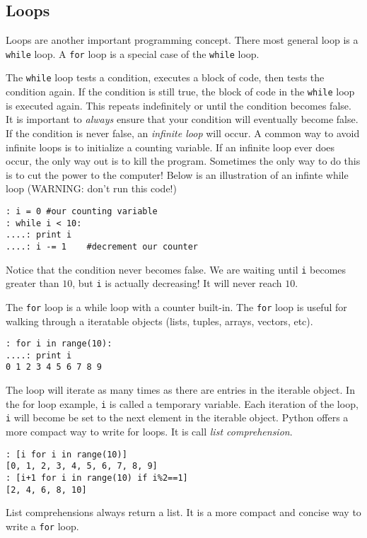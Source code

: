 \subsection*{Loops}
Loops are another important programming concept. There most general loop is a {\tt while} loop.  A {\tt for} loop is a special case of the {\tt while} loop.

The {\tt while} loop tests a condition, executes a block of code, then tests the condition again.  If the condition is still true, the block of code in the {\tt while} loop is executed again.  This repeats indefinitely or until the condition becomes false.  It is important to \emph{always} ensure that your condition will eventually become false.  If the condition is never false, an \emph{infinite loop} will occur.  A common way to avoid infinite loops is to initialize a counting variable.  If an infinite loop ever does occur, the only way out is to kill the program.  Sometimes the only way to do this is to cut the power to the computer!  Below is an illustration of an infinte while loop (WARNING: don't run this code!)
\begin{lstlisting}
: i = 0 #our counting variable
: while i < 10:
....: print i
....: i -= 1    #decrement our counter
\end{lstlisting}

Notice that the condition never becomes false.  We are waiting until {\tt i} becomes greater than $10$, but {\tt i} is actually decreasing!  It will never reach $10$.

The {\tt for} loop is a while loop with a counter built-in.  The {\tt for} loop is useful for walking through a iteratable objects (lists, tuples, arrays, vectors, etc).  
\begin{lstlisting}
: for i in range(10):
....: print i
0 1 2 3 4 5 6 7 8 9
\end{lstlisting}

The loop will iterate as many times as there are entries in the iterable object. In the for loop example, {\tt i} is called a temporary variable.  Each iteration of the loop, {\tt i} will become be set to the next element in the iterable object.  Python offers a more compact way to write for loops.  It is call \emph{list comprehension}.
\begin{lstlisting}
: [i for i in range(10)]
[0, 1, 2, 3, 4, 5, 6, 7, 8, 9]
: [i+1 for i in range(10) if i%2==1] 
[2, 4, 6, 8, 10]
\end{lstlisting}

List comprehensions always return a list.  It is a more compact and concise  way to write a {\tt for} loop.

